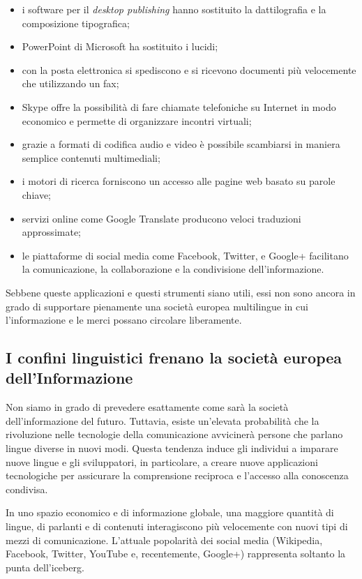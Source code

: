 \begin{multicols}{2}
\begin{itemize}
\item i software per il \emph{desktop publishing} hanno sostituito la
  dattilografia e la composizione tipografica;
\item PowerPoint di Microsoft ha sostituito i lucidi;
\item con la posta elettronica si spediscono e si ricevono documenti pi\`{u}
  velocemente che utilizzando un fax;
\item Skype offre la possibilit\`{a} di fare chiamate telefoniche su Internet in
  modo economico e permette di organizzare incontri virtuali;
\item grazie a formati di codifica audio e video \`{e} possibile scambiarsi in
  maniera semplice contenuti multimediali;
\item i motori di ricerca forniscono un accesso alle pagine web basato su parole
  chiave;
\item servizi online come Google Translate producono veloci traduzioni
  approssimate;
\item le piattaforme di social media come Facebook, Twitter, e Google+ facilitano
  la comunicazione, la collaborazione e la condivisione dell'informazione.
\end{itemize}

Sebbene queste applicazioni e questi strumenti siano utili, essi non sono
ancora in grado di supportare pienamente una societ\`{a} europea multilingue
in cui l'informazione e le merci possano circolare liberamente.

\subsection{I confini linguistici frenano la societ\`{a} europea dell'Informazione}

Non siamo in grado di prevedere esattamente come sar\`{a} la
societ\`{a} dell'informazione del futuro. Tuttavia, esiste un'elevata
probabilit\`{a} che la rivoluzione nelle tecnologie della
comunicazione avviciner\`{a} persone che parlano lingue diverse in
nuovi modi. Questa tendenza induce gli individui a imparare nuove
lingue e gli sviluppatori, in particolare, a creare nuove applicazioni
tecnologiche per assicurare la comprensione reciproca e l'accesso alla
conoscenza condivisa. 

In uno spazio economico e di informazione globale, una maggiore quantit\`{a} di  lingue, di parlanti e di contenuti interagiscono pi\`{u} velocemente con nuovi tipi di mezzi di comunicazione. L'attuale popolarit\`{a} dei social media (Wikipedia, Facebook, Twitter, YouTube e, recentemente, Google+) rappresenta soltanto la punta dell'iceberg.


\end{multicols}
